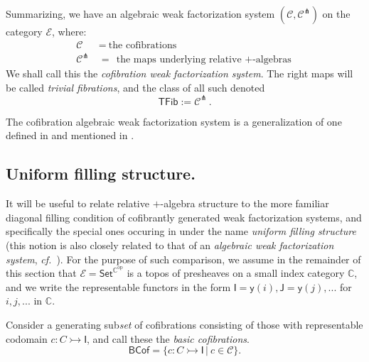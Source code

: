 \documentclass[11pt,reqno]{amsart}
\newcommand{\cf}{\emph{cf.}}
\newcommand{\bbC}{\ensuremath{\mathbb{C}}}
\newcommand{\EE}{\ensuremath{\mathcal{E}}}
\newcommand{\psh}[1]{\ensuremath{\mathsf{Set}^{#1^{\mathrm{op}}}}}
\newcommand{\rep}[1]{\ensuremath{\mathsf{#1}}}%
\newcommand{\y}{\ensuremath{\mathsf{y}}} %
\newcommand{\mono}{\ensuremath{\rightarrowtail}}
\theoremstyle{remark}
\theoremstyle{definition}
\begin{document}
Summarizing, we have an algebraic weak factorization system $(\mathcal{C}, \mathcal{C}^\pitchfork)$ on the category \EE, where:
\begin{align*}
\mathcal{C}\ &=\ \text{the cofibrations}\\
\mathcal{C}^\pitchfork\, &=\  \text{the maps underlying relative $+$-algebras}
\end{align*}
We shall call this the \emph{cofibration weak factorization system}. 
The right maps will be called \emph{trivial fibrations}, and the class of all such denoted
\[
\mathsf{TFib} := \mathcal{C}^\pitchfork\,.
\]

The cofibration algebraic weak factorization system is a generalization of one defined in \cite{bourke-garner-I} and mentioned in \cite{GS}.

\subsection*{Uniform filling structure.}

It will be useful to relate relative $+$-algebra structure to the more familiar diagonal filling condition of cofibrantly generated weak factorization systems, and specifically the special ones occuring in \cite{CCHM:2018ctt} under the name \emph{uniform filling structure} (this notion is also closely related to that of an \emph{algebraic weak factorization system}, \cf\ \cite{garner:small-object-argument,riehl-algebraic-model}).  For the purpose of such comparison, we assume in the remainder of this section that $\EE= \psh{\bbC}$ is a topos of presheaves on a small index category $\bbC$, and we write the representable functors in the form $\rep{I} = \y{(i)}, \rep{J} = \y{(j)}, ...$ for $i, j, ...$ in $\bbC$.

Consider a generating sub\emph{set} of cofibrations consisting of those with representable codomain $c : C \mono \rep{I}$, and call these the \emph{basic cofibrations}.
\begin{equation}\label{eq:basiccof}
\mathsf{BCof} = \{c : C\mono \rep{I}\,|\ c\in \mathcal{C} \}.
\end{equation}
\end{document}
